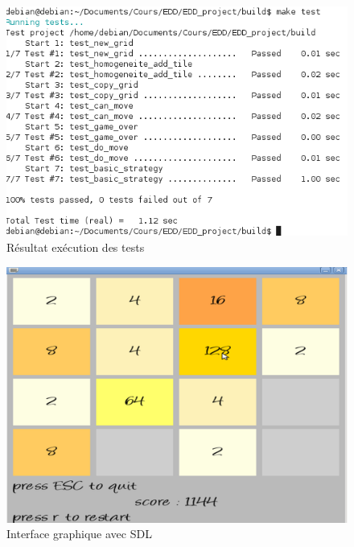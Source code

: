 \documentclass[12pt]{article}
\begin{document}
\begin{figure}
   \caption{\label{test} Résultat exécution des tests}
   \includegraphics[scale=0.6]{test.png}
\end{figure}

\begin{figure}
   \caption{\label{sdl} Interface graphique avec SDL}
   \includegraphics[scale=0.15]{sdl.png}
\end{figure}
\end{document}
